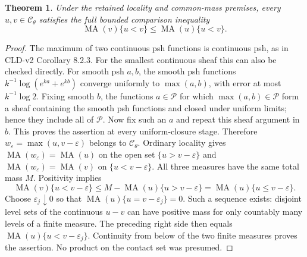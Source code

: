 \documentclass[11pt]{article}
\newtheorem{theorem}{Theorem}
\newcommand{\MA}{\operatorname{MA}}
\begin{document}
\begin{theorem}\label{thm:bounded-comparison}
Under the retained locality and common-mass premises, every
$u,v\in\mathcal C_\theta$ satisfies the full bounded comparison
inequality
\[
             \MA(v)\{u<v\}\leq\MA(u)\{u<v\}.
\]
\end{theorem}
\begin{proof}
The maximum of two continuous psh functions is continuous psh,
as in CLD-v2 Corollary 8.2.3. For the smallest continuous sheaf
this can also be checked directly. For smooth psh $a,b$, the smooth
psh functions $k^{-1}\log(e^{ka}+e^{kb})$ converge uniformly to
$\max(a,b)$, with error at most $k^{-1}\log2$.
Fixing smooth $b$, the functions $a\in\mathscr P$ for which
$\max(a,b)\in\mathscr P$ form a sheaf containing the smooth psh
functions and closed under uniform limits; hence they include all
of $\mathscr P$. Now fix such an $a$ and repeat this sheaf argument
in $b$. This proves the assertion at every uniform-closure stage.
Therefore
$w_\varepsilon=\max(u,v-\varepsilon)$ belongs to
$\mathcal C_\theta$. Ordinary locality gives $\MA(w_\varepsilon)
=\MA(u)$ on the open set $\{u>v-\varepsilon\}$ and
$\MA(w_\varepsilon)=\MA(v)$ on $\{u<v-\varepsilon\}$.
All three measures have the same total mass $M$. Positivity implies
\[
 \MA(v)\{u<v-\varepsilon\}
 \leq M-\MA(u)\{u>v-\varepsilon\}
 =\MA(u)\{u\leq v-\varepsilon\}.
\]
Choose $\varepsilon_j\downarrow0$ so that
$\MA(u)\{u=v-\varepsilon_j\}=0$. Such a sequence exists:
disjoint level sets of the continuous $u-v$ can have positive mass
for only countably many levels of a finite measure. The preceding
right side then equals $\MA(u)\{u<v-\varepsilon_j\}$.
Continuity from below of the two finite measures proves the assertion.
No product on the contact set was presumed.
\end{proof}
\end{document}
